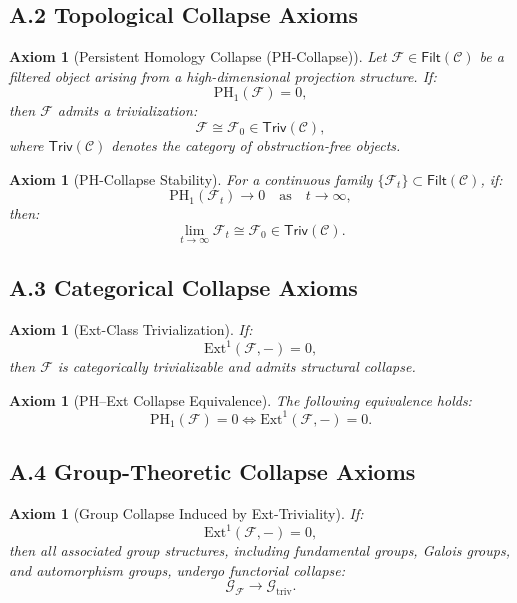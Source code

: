 \documentclass[11pt]{article}
\newtheorem{axiom}[theorem]{Axiom}
\begin{document}
\subsection*{A.2 Topological Collapse Axioms}

\begin{axiom}[Persistent Homology Collapse (PH-Collapse)]
Let $\mathcal{F} \in \mathsf{Filt}(\mathcal{C})$ be a filtered object arising from a high-dimensional projection structure. If:
\[
\mathrm{PH}_1(\mathcal{F}) = 0,
\]
then $\mathcal{F}$ admits a trivialization:
\[
\mathcal{F} \cong \mathcal{F}_0 \in \mathsf{Triv}(\mathcal{C}),
\]
where $\mathsf{Triv}(\mathcal{C})$ denotes the category of obstruction-free objects.
\end{axiom}

\begin{axiom}[PH-Collapse Stability]
For a continuous family $\{ \mathcal{F}_t \} \subset \mathsf{Filt}(\mathcal{C})$, if:
\[
\mathrm{PH}_1(\mathcal{F}_t) \longrightarrow 0 \quad \text{as} \quad t \to \infty,
\]
then:
\[
\lim_{t \to \infty} \mathcal{F}_t \cong \mathcal{F}_0 \in \mathsf{Triv}(\mathcal{C}).
\]
\end{axiom}

\subsection*{A.3 Categorical Collapse Axioms}

\begin{axiom}[Ext-Class Trivialization]
If:
\[
\mathrm{Ext}^1(\mathcal{F}, -) = 0,
\]
then $\mathcal{F}$ is categorically trivializable and admits structural collapse.
\end{axiom}

\begin{axiom}[PH–Ext Collapse Equivalence]
The following equivalence holds:
\[
\mathrm{PH}_1(\mathcal{F}) = 0 \iff \mathrm{Ext}^1(\mathcal{F}, -) = 0.
\]
\end{axiom}

\subsection*{A.4 Group-Theoretic Collapse Axioms}

\begin{axiom}[Group Collapse Induced by Ext-Triviality]
If:
\[
\mathrm{Ext}^1(\mathcal{F}, -) = 0,
\]
then all associated group structures, including fundamental groups, Galois groups, and automorphism groups, undergo functorial collapse:
\[
\mathcal{G}_{\mathcal{F}} \longrightarrow \mathcal{G}_{\mathrm{triv}}.
\]
\end{axiom}
\end{document}
